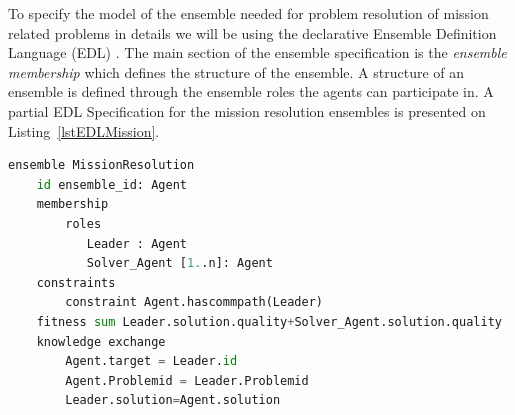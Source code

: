 \documentclass[journal]{IEEEtran}
\theoremstyle{definition}
\newcommand\patrizio[1]{\nb{Patrizio}{#1}}
\begin{document}
 
 





 

 
 
 


To specify the model of the ensemble needed for problem resolution of mission related problems in details we will be  using the declarative Ensemble
Definition Language (EDL) \cite{bures2015towards}.
The main section of the ensemble specification is
the \textit{ensemble membership} which defines the
structure of the ensemble.
A structure of an ensemble is defined through the ensemble
roles the agents can participate in. A partial EDL Specification for the mission resolution ensembles is presented on Listing~\ref{lstEDLMission}.
\begin{lstlisting}[caption=EDL Specification for mission resolution ensembles, language=Python, label=lstEDLMission]
ensemble MissionResolution
    id ensemble_id: Agent
    membership
        roles
           Leader : Agent
           Solver_Agent [1..n]: Agent
    constraints
        constraint Agent.hascommpath(Leader)
    fitness sum Leader.solution.quality+Solver_Agent.solution.quality
    knowledge exchange
        Agent.target = Leader.id
        Agent.Problemid = Leader.Problemid
        Leader.solution=Agent.solution
\end{lstlisting}
\end{document}

